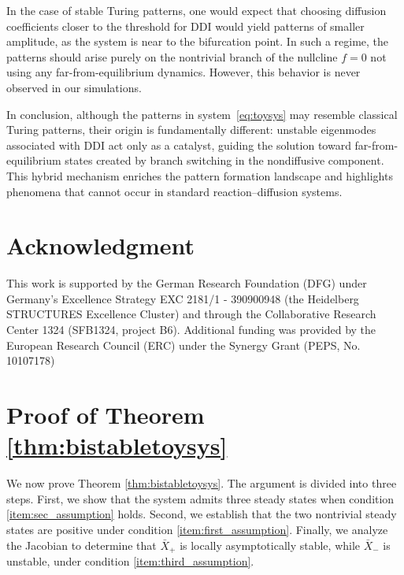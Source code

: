 \documentclass[12pt, a4paper]{amsart}
\numberwithin{equation}{section}
\newcommand{\CSS}{\bar{X}}
\begin{document}
In the case of stable Turing patterns, one would expect that choosing diffusion coefficients closer to the threshold for DDI would yield patterns of smaller amplitude, as the system is near to the bifurcation point. In such a regime, the patterns should arise purely on the nontrivial branch of the nullcline $f=0$ not using any far-from-equilibrium dynamics. However, this behavior is never observed in our simulations.

In conclusion, although the patterns in system~\eqref{eq:toysys} may resemble classical Turing patterns, their origin is fundamentally different: unstable eigenmodes associated with DDI act only as a catalyst, guiding the solution toward far-from-equilibrium states created by branch switching in the nondiffusive component.
This hybrid mechanism enriches the pattern formation landscape and highlights phenomena that cannot occur in standard reaction--diffusion systems.



\section*{Acknowledgment}
{This work is supported by the German Research Foundation (DFG) under Germany’s Excellence Strategy EXC 2181/1 - 390900948 (the Heidelberg STRUCTURES Excellence Cluster) and through the Collaborative Research Center 1324 (SFB1324, project B6). Additional funding was provided by the European Research Council (ERC) under the Synergy Grant (PEPS, No. 10107178)}







\appendix


\section{Proof of Theorem \ref{thm:bistabletoysys}}
\label{app1}

We now prove Theorem \ref{thm:bistabletoysys}. The argument is divided into three steps. 
First, we show that the system admits three steady states when condition \ref{item:sec_assumption} holds.  
Second, we establish that the two nontrivial steady states are positive under condition \ref{item:first_assumption}.  
Finally, we analyze the Jacobian to determine that $\CSS_+$ is locally asymptotically stable, while $\CSS_-$ is unstable, under condition \ref{item:third_assumption}.
\end{document}
